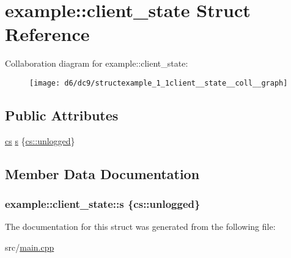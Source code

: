 \hypertarget{structexample_1_1client__state}{}\section{example\+:\+:client\+\_\+state Struct Reference}
\label{structexample_1_1client__state}


Collaboration diagram for example\+:\+:client\+\_\+state\+:\nopagebreak
\begin{figure}[H]
\begin{center}
\leavevmode
\texttt{[image: d6/dc9/structexample\_1\_1client\_\_state\_\_coll\_\_graph]}
\end{center}
\end{figure}
\subsection*{Public Attributes}
\begin{DoxyCompactItemize}
\item 
\hyperlink{namespaceexample_a229123c56827091122d3cc29bf73a6c0}{cs} \hyperlink{structexample_1_1client__state_ad0b32717e8d42e11303cee9327fd912e}{s} \{\hyperlink{namespaceexample_a229123c56827091122d3cc29bf73a6c0a4a36cb415836aac2347936579383dcf4}{cs\+::unlogged}\}
\end{DoxyCompactItemize}


\subsection{Member Data Documentation}
\hypertarget{structexample_1_1client__state_ad0b32717e8d42e11303cee9327fd912e}{}
\subsubsection[{s}]{ example\+::client\+\_\+state\+::s \{{\bf cs\+::unlogged}\}}\label{structexample_1_1client__state_ad0b32717e8d42e11303cee9327fd912e}


The documentation for this struct was generated from the following file\+:\begin{DoxyCompactItemize}
\item 
src/\hyperlink{main_8cpp}{main.\+cpp}\end{DoxyCompactItemize}
